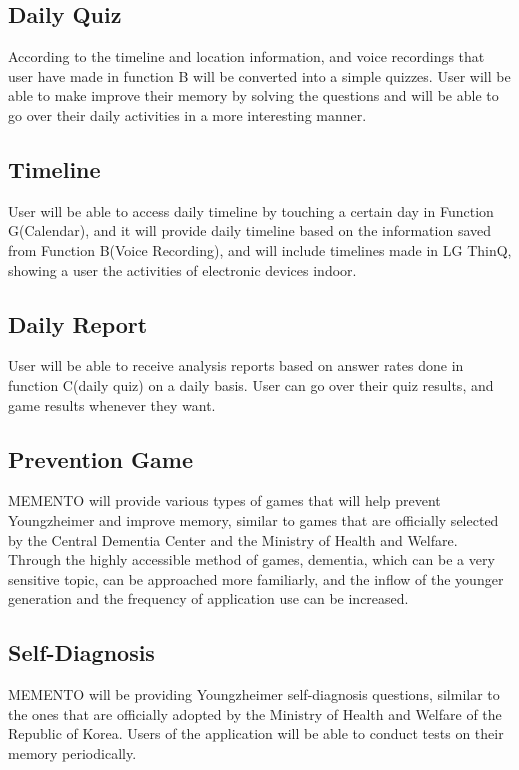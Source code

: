 \documentclass[conference]{IEEEtran}
\begin{document}
\subsection{Daily Quiz}
According to the timeline and location information, and voice recordings that user have made in function B will be converted into a simple quizzes. User will be able to make improve their memory by solving the questions and will be able to go over their daily activities in a more interesting manner.\\
\subsection{Timeline}
User will be able to access daily timeline by touching a certain day in Function G(Calendar), and it will provide daily timeline based on the information saved from Function B(Voice Recording), and will include timelines made in LG ThinQ, showing a user the activities of electronic devices indoor. \\
\subsection{Daily Report}
User will be able to receive analysis reports based on answer rates done in function C(daily quiz) on a daily basis. User can go over their quiz results, and game results whenever they want. \\
\subsection{Prevention Game}
MEMENTO will provide various types of games that will help prevent Youngzheimer and improve memory, similar to games that are officially selected by the Central Dementia Center and the Ministry of Health and Welfare. Through the highly accessible method of games, dementia, which can be a very sensitive topic, can be approached more familiarly, and the inflow of the younger generation and the frequency of application use can be increased.\\
\subsection{Self-Diagnosis}
MEMENTO will be providing Youngzheimer self-diagnosis questions, silmilar to the ones that are officially adopted by the Ministry of Health and Welfare of the Republic of Korea. Users of the application will be able to conduct tests on their memory periodically.\\
\end{document}
